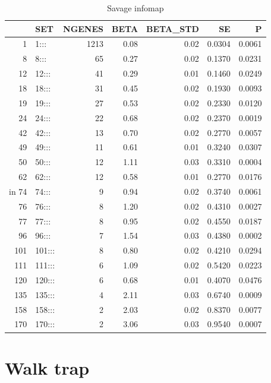 \begin{table}[ht]
\centering
\begin{tabular}{rlrrrrr}
  \hline
 & SET & NGENES & BETA & BETA\_STD & SE & P \\ 
  \hline
1 & 1::: & 1213 & 0.08 & 0.02 & 0.0304 & 0.0061 \\ 
  8 & 8::: & 65 & 0.27 & 0.02 & 0.1370 & 0.0231 \\ 
  12 & 12::: & 41 & 0.29 & 0.01 & 0.1460 & 0.0249 \\ 
  18 & 18::: & 31 & 0.45 & 0.02 & 0.1930 & 0.0093 \\ 
  19 & 19::: & 27 & 0.53 & 0.02 & 0.2330 & 0.0120 \\ 
  24 & 24::: & 22 & 0.68 & 0.02 & 0.2370 & 0.0019 \\ 
  42 & 42::: & 13 & 0.70 & 0.02 & 0.2770 & 0.0057 \\ 
  49 & 49::: & 11 & 0.61 & 0.01 & 0.3240 & 0.0307 \\ 
  50 & 50::: & 12 & 1.11 & 0.03 & 0.3310 & 0.0004 \\ 
  62 & 62::: & 12 & 0.58 & 0.01 & 0.2770 & 0.0176 \\ in
  74 & 74::: &  9 & 0.94 & 0.02 & 0.3740 & 0.0061 \\ 
  76 & 76::: &  8 & 1.20 & 0.02 & 0.4310 & 0.0027 \\ 
  77 & 77::: &  8 & 0.95 & 0.02 & 0.4550 & 0.0187 \\ 
  96 & 96::: &  7 & 1.54 & 0.03 & 0.4380 & 0.0002 \\ 
  101 & 101::: &  8 & 0.80 & 0.02 & 0.4210 & 0.0294 \\ 
  111 & 111::: &  6 & 1.09 & 0.02 & 0.5420 & 0.0223 \\ 
  120 & 120::: &  6 & 0.68 & 0.01 & 0.4070 & 0.0476 \\ 
  135 & 135::: &  4 & 2.11 & 0.03 & 0.6740 & 0.0009 \\ 
  158 & 158::: &  2 & 2.03 & 0.02 & 0.8370 & 0.0077 \\ 
  170 & 170::: &  2 & 3.06 & 0.03 & 0.9540 & 0.0007 \\ 
   \hline
\end{tabular}
\caption{Savage infomap}
\label{tab:Infomap savage}
\end{table}

\section{Walk trap}

